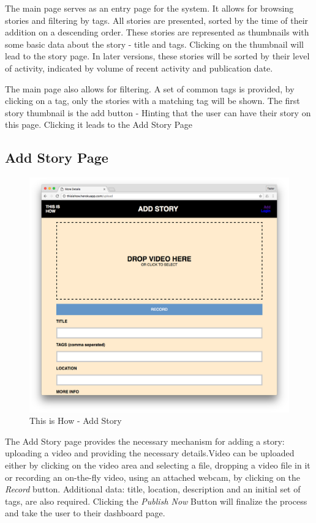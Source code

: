 The main page serves as an entry page for the system. It allows for browsing stories and filtering by tags. All stories are presented, sorted by the time of their addition on a descending order. These stories are represented as thumbnails with some basic data about the story - title and tags. Clicking on the thumbnail will lead to the story page. In later versions, these stories will be sorted by their level of activity, indicated by volume of recent activity and publication date. 

The main page also allows for filtering. A set of common tags is provided, by clicking on a tag, only the stories with a matching tag will be shown. The first story thumbnail is the add button - Hinting that the user can have their story on this page. Clicking it leads to the Add Story Page

\subsection{Add Story Page}

   \begin{figure}[thpb]
      \centering
      \includegraphics[width=\textwidth]{figures/addstory.png}
      \caption{This is How - Add Story}
      \label{fig_add_story}
   \end{figure}

The Add Story page provides the necessary mechanism for adding a story: uploading a video and providing the necessary details.Video can be uploaded either by clicking on the video area and selecting a file, dropping a video file in it or recording an on-the-fly video, using an attached webcam, by clicking on the \textit{Record} button. Additional data: title, location, description and an initial set of tags, are also required. Clicking the \textit{Publish Now} Button will finalize the process and take the user to their dashboard page. 

